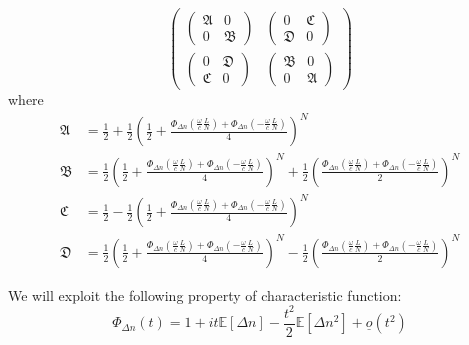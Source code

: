 \documentclass[12pt, notitlepage]{report}
\begin{document}
\begin{equation*}
\begin{pmatrix}
	\begin{pmatrix}
		\mathfrak{A} & 0 \\
		0 & \mathfrak{B}
	\end{pmatrix} & 
	\begin{pmatrix}
		0 & \mathfrak{C} \\
	\mathfrak{D} & 0
	\end{pmatrix} \\
	\begin{pmatrix}
		0 & \mathfrak{D} \\
		\mathfrak{C} & 0
	\end{pmatrix} &
	\begin{pmatrix}
		\mathfrak{B} & 0 \\
		0 & \mathfrak{A}
	\end{pmatrix}
\end{pmatrix}
\end{equation*}
where
\begin{align*}
	\mathfrak{A} &= \frac{1}{2} +\frac{1}{2}\left(\frac{1}{2}+\frac{\Phi_{\Delta n}\left( \frac{\omega}{c}\frac{L}{N} \right) + \Phi_{\Delta n}\left(- \frac{\omega}{c}\frac{L}{N} \right)}{4}\right)^N \\
	\mathfrak{B} &= \frac{1}{2}\left(\frac{1}{2}+\frac{\Phi_{\Delta n}\left( \frac{\omega}{c}\frac{L}{N} \right) + \Phi_{\Delta n}\left(- \frac{\omega}{c}\frac{L}{N} \right)}{4}\right)^N+ \frac{1}{2}\left(\frac{\Phi_{\Delta n}\left( \frac{\omega}{c}\frac{L}{N} \right) + \Phi_{\Delta n}\left(- \frac{\omega}{c}\frac{L}{N} \right)}{2}\right)^N \\
	\mathfrak{C} &= \frac{1}{2} -\frac{1}{2}\left(\frac{1}{2}+\frac{\Phi_{\Delta n}\left( \frac{\omega}{c}\frac{L}{N} \right) + \Phi_{\Delta n}\left(- \frac{\omega}{c}\frac{L}{N} \right)}{4}\right)^N \\
	\mathfrak{D} &= \frac{1}{2}\left(\frac{1}{2}+\frac{\Phi_{\Delta n}\left( \frac{\omega}{c}\frac{L}{N} \right) + \Phi_{\Delta n}\left(- \frac{\omega}{c}\frac{L}{N} \right)}{4}\right)^N- \frac{1}{2}\left(\frac{\Phi_{\Delta n}\left( \frac{\omega}{c}\frac{L}{N} \right) + \Phi_{\Delta n}\left(- \frac{\omega}{c}\frac{L}{N} \right)}{2}\right)^N
\end{align*}

We will exploit the following property of characteristic function:
\begin{equation*}
\Phi_{\Delta n}\left(t\right) = 1 + it\mathbb{E}\left[\Delta n\right] - \frac{t^2}{2}\mathbb{E}\left[\Delta n^2\right] + \underline{o}\left(t^2\right)
\end{equation*}
\end{document}
